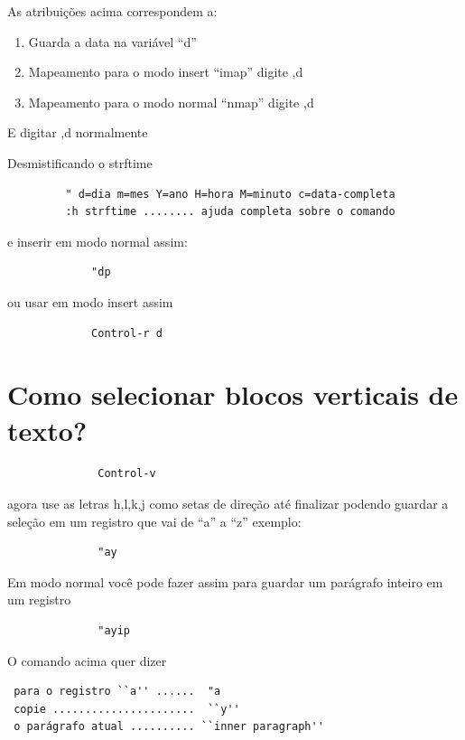 \documentclass[10pt,a4paper,openany]{book}
\begin{document}
As atribuições acima correspondem a:

\begin{enumerate}
 \item  Guarda a data na variável ``d''
 \item  Mapeamento para o modo insert ``imap'' digite ,d
 \item  Mapeamento para o modo normal ``nmap'' digite ,d
\end{enumerate}

E digitar ,d normalmente

Desmistificando o strftime
\begin{verbatim}
		 " d=dia m=mes Y=ano H=hora M=minuto c=data-completa
		 :h strftime ........ ajuda completa sobre o comando
\end{verbatim}

e inserir em modo normal assim:

\begin{verbatim}
			 "dp
\end{verbatim}

ou usar em modo insert assim

\begin{verbatim}
			 Control-r d
\end{verbatim}

\section{Como selecionar blocos verticais de texto?}
\label{Como selecionar blocos verticais de texto?}

\begin{verbatim}
			  Control-v
\end{verbatim}

agora use as letras h,l,k,j como setas de direção até finalizar
podendo guardar a seleção em um registro que vai de ``a'' a ``z'' exemplo:

\begin{verbatim}
			  "ay
\end{verbatim}

Em modo normal você pode fazer assim para guardar um parágrafo inteiro em um registro

\begin{verbatim}
			  "ayip
\end{verbatim}

O comando acima quer dizer

\begin{verbatim}
 para o registro ``a'' ......  "a
 copie ......................  ``y''
 o parágrafo atual .......... ``inner paragraph''
\end{verbatim}
\end{document}
